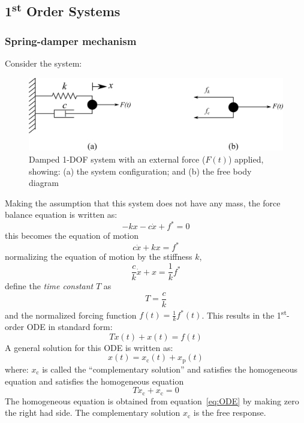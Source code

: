 \documentclass[12pt,letter]{article}
\begin{document}
	\subsection{1\textsuperscript{st} Order Systems}	




	\subsubsection{Spring-damper mechanism}


Consider the system:
\begin{figure}[H]
	\centering
	\includegraphics[]{../figures/1-DOF-spring_dashpot_horizontal_forced_FBD.png}
	\caption{Damped 1-DOF system with an external force ($F(t)$) applied, showing: (a) the system configuration; and (b) the free body diagram}
\end{figure}	
Making the assumption that this system does not have any mass, the force balance equation is written as: 
\begin{equation}
-kx - c\dot{x} + f^* =0
\end{equation}
this becomes the equation of motion
\begin{equation}
c\dot{x} + kx = f^*
\end{equation}
normalizing the equation of motion by the stiffness $k$, 
\begin{equation}
\frac{c}{k}\dot{x} + x = \frac{1}{k}f^*
\end{equation}
define the \emph{time constant} $T$ as 
\begin{equation}
T=\frac{c}{k}
\end{equation}
and the normalized forcing function $f(t) = \frac{1}{k}f^*(t)$. This results in the 1\textsuperscript{st}-order ODE in standard form:
\begin{equation}
T\dot{x}(t) + x(t) = f(t)
\label{eq:ODE}
\end{equation}
A general solution for this ODE is written as:
\begin{equation}
x(t) = x_\text{c}(t)+x_\text{p}(t)
\label{eq:ODE_solution}
\end{equation}
where: $x_\text{c}$ is called the ``complementary solution'' and satisfies the homogeneous equation and satisfies the homogeneous equation 
\begin{equation}
T\dot{x}_\text{c} + x_\text{c} = 0
\end{equation}
The homogeneous equation is obtained from equation~\ref{eq:ODE} by making zero the right had side.  The complementary solution $x_\text{c}$ is the free response.
\end{document}

